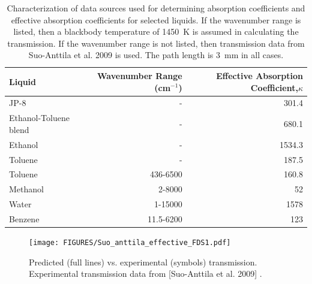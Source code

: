 \begin{table}[ht]
\caption{Characterization of data sources used for determining absorption coefficients and effective absorption coefficients for selected liquids. If the wavenumber range is listed, then a blackbody temperature of 1450~K is assumed in calculating the transmission. If the wavenumber range is not listed, then transmission data from Suo-Anttila et al. 2009 \cite{Suo-Anttila:PCT2009} is used. The path length is 3~mm in all cases. }

\centering
\begin{tabular}{l r r}
\hline\hline
Liquid & Wavenumber Range (cm$^{-1}$) & Effective Absorption Coefficient,$\kappa$  \\ [0.5ex]
\hline
JP-8 \cite{Suo-Anttila:PCT2009}     &  -          & 301.4   \\
Ethanol-Toluene blend \cite{Suo-Anttila:PCT2009}                &  -          & 680.1   \\
Ethanol \cite{Suo-Anttila:PCT2009}   &  -          & 1534.3  \\
Toluene \cite{Suo-Anttila:PCT2009}   &  -          & 187.5   \\
Toluene \cite{Bertie:AS1994a}        &  436-6500   & 160.8   \\
Methanol\cite{Bertie:AS1993a}                           &  2-8000     & 52\footnotemark     \\
Water   \cite{Bertie:AS1996}                             &  1-15000  & 1578    \\
Benzene \cite{Bertie:AS1993b}                             &  11.5-6200  & 123     \\
\hline
\end{tabular}
\label{tbl_abscoeff}
\end{table}

\begin{figure}[ht]
    \centering
    \texttt{[image: FIGURES/Suo\_anttila\_effective\_FDS1.pdf]}
    \caption{Predicted (full lines) vs. experimental (symbols) transmission.  Experimental transmission data from [Suo-Anttila et al. 2009] \cite{Suo-Anttila:PCT2009}.}
    \label{fig_trans2}
\end{figure}

